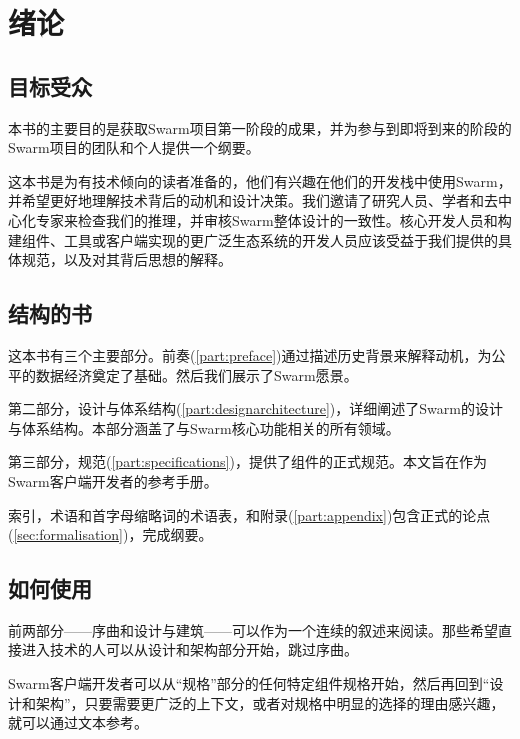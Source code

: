 \chapter{绪论\statusgreen}
\green{}
\section*{目标受众\statusgreen}
本书的主要目的是获取Swarm项目第一阶段的成果，并为参与到即将到来的阶段的Swarm项目的团队和个人提供一个纲要。

这本书是为有技术倾向的读者准备的，他们有兴趣在他们的开发栈中使用Swarm，并希望更好地理解技术背后的动机和设计决策。我们邀请了研究人员、学者和去中心化专家来检查我们的推理，并审核Swarm整体设计的一致性。核心开发人员和构建组件、工具或客户端实现的更广泛生态系统的开发人员应该受益于我们提供的具体规范，以及对其背后思想的解释。

\section*{结构的书\statusgreen}

这本书有三个主要部分。前奏(\ref{part:preface})通过描述历史背景来解释动机，为公平的数据经济奠定了基础。然后我们展示了Swarm愿景。

第二部分，设计与体系结构(\ref{part:designarchitecture})，详细阐述了Swarm的设计与体系结构。本部分涵盖了与Swarm核心功能相关的所有领域。

第三部分，规范(\ref{part:specifications})，提供了组件的正式规范。本文旨在作为Swarm客户端开发者的参考手册。

索引，术语和首字母缩略词的术语表，和附录(\ref{part:appendix})包含正式的论点(\ref{sec:formalisation})，完成纲要。

\section*{如何使用}

前两部分——序曲和设计与建筑——可以作为一个连续的叙述来阅读。那些希望直接进入技术的人可以从设计和架构部分开始，跳过序曲。

Swarm客户端开发者可以从“规格”部分的任何特定组件规格开始，然后再回到“设计和架构”，只要需要更广泛的上下文，或者对规格中明显的选择的理由感兴趣，就可以通过文本参考。
